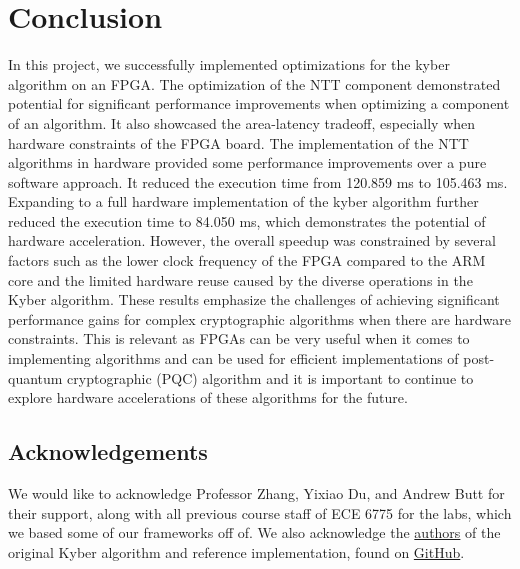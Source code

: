 
\section*{Conclusion}


In this project, we successfully implemented optimizations for the kyber algorithm on an FPGA. The optimization of the NTT component
demonstrated potential for significant performance improvements when optimizing a component of an algorithm. It also showcased
the area-latency tradeoff, especially when hardware constraints of the FPGA board. The implementation of the NTT algorithms in hardware
provided some performance improvements over a pure software approach. It reduced the execution time from 120.859 ms to 105.463 ms.
Expanding to a full hardware implementation of the kyber algorithm further reduced the execution time to 84.050 ms, which demonstrates
the potential of hardware acceleration. However, the overall speedup was constrained by several factors such as the lower clock
frequency of the FPGA compared to the ARM core and the limited hardware reuse caused by the diverse operations in the Kyber algorithm.
These results emphasize the challenges of achieving significant performance gains for complex cryptographic algorithms when there are
hardware constraints. This is relevant as FPGAs can be very useful when it comes to implementing algorithms and can be used for efficient
implementations of post-quantum cryptographic (PQC) algorithm and it is important to continue to explore hardware accelerations of these
algorithms for the future.


\subsection*{Acknowledgements}

We would like to acknowledge Professor Zhang, Yixiao Du, and
Andrew Butt for their support, along with all previous course
staff of ECE 6775 for the labs, which we based some of our
frameworks off of. We also acknowledge the
\href{https://github.com/pq-crystals/kyber/blob/main/AUTHORS}{authors}
of the original Kyber algorithm and reference implementation,
found on \href{https://github.com/pq-crystals/kyber}{GitHub}.
